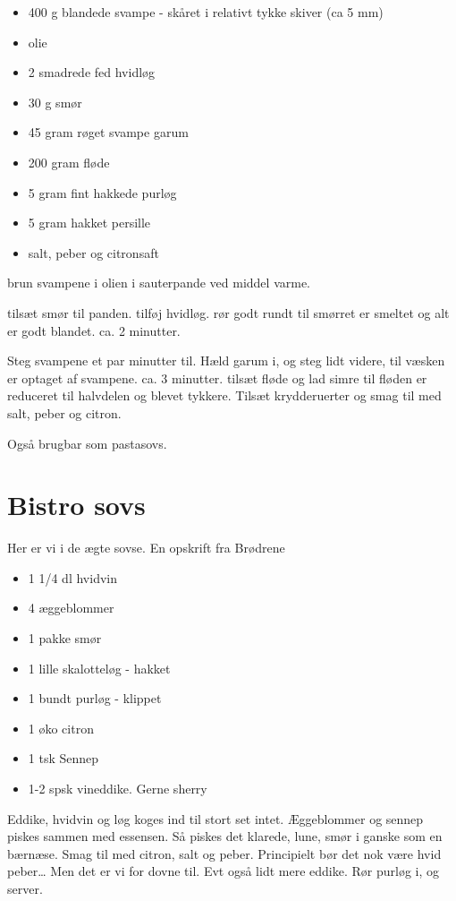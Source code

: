 \documentclass[
  letterpaper,
  DIV=11,
  numbers=noendperiod]{scrreprt}
\providecommand{\tightlist}{%
  \setlength{\itemsep}{0pt}\setlength{\parskip}{0pt}}\usepackage{longtable,booktabs,array}
\begin{document}
\begin{itemize}
\tightlist
\item
  400 g blandede svampe - skåret i relativt tykke skiver (ca 5 mm)
\item
  olie
\item
  2 smadrede fed hvidløg
\item
  30 g smør
\item
  45 gram røget svampe garum
\item
  200 gram fløde
\item
  5 gram fint hakkede purløg
\item
  5 gram hakket persille
\item
  salt, peber og citronsaft
\end{itemize}

brun svampene i olien i sauterpande ved middel varme.

tilsæt smør til panden. tilføj hvidløg. rør godt rundt til smørret er
smeltet og alt er godt blandet. ca. 2 minutter.

Steg svampene et par minutter til. Hæld garum i, og steg lidt videre,
til væsken er optaget af svampene. ca. 3 minutter. tilsæt fløde og lad
simre til fløden er reduceret til halvdelen og blevet tykkere. Tilsæt
krydderuerter og smag til med salt, peber og citron.

Også brugbar som pastasovs.

\hypertarget{bistro-sovs}{%
\section{Bistro sovs}\label{bistro-sovs}}

Her er vi i de ægte sovse. En opskrift fra Brødrene

\begin{itemize}
\tightlist
\item
  1 1/4 dl hvidvin
\item
  4 æggeblommer
\item
  1 pakke smør
\item
  1 lille skalotteløg - hakket
\item
  1 bundt purløg - klippet
\item
  1 øko citron
\item
  1 tsk Sennep
\item
  1-2 spsk vineddike. Gerne sherry
\end{itemize}

Eddike, hvidvin og løg koges ind til stort set intet. Æggeblommer og
sennep piskes sammen med essensen. Så piskes det klarede, lune, smør i
ganske som en bærnæse. Smag til med citron, salt og peber. Principielt
bør det nok være hvid peber\ldots{} Men det er vi for dovne til. Evt
også lidt mere eddike. Rør purløg i, og server.
\end{document}

